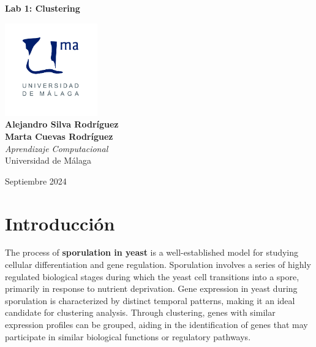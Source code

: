 \documentclass{article}
\begin{document}
\begin{titlepage}
	\centering
	\vspace*{3cm}
	
	{\Huge \textbf{Lab 1: Clustering}\\[0.5cm]}
	
	\vspace{2cm}
	\includegraphics[width=0.3\textwidth]{images/uma_logo.jpg}\\[1cm]
	
	{\LARGE \textbf{Alejandro Silva Rodríguez}\\[0.5cm]}
	{\LARGE \textbf{Marta Cuevas Rodríguez}\\[0.5cm]}
	{\large \textit{Aprendizaje Computacional}\\
		Universidad de Málaga\\
		}
	
	\vfill
	
	{\large Septiembre 2024}
\end{titlepage}

\tableofcontents

\newpage

\section{Introducción}
The process of \textbf{sporulation in yeast} is a well-established model for studying cellular differentiation and gene regulation. Sporulation involves a series of highly regulated biological stages during which the yeast cell transitions into a spore, primarily in response to nutrient deprivation. Gene expression in yeast during sporulation is characterized by distinct temporal patterns, making it an ideal candidate for clustering analysis. Through clustering, genes with similar expression profiles can be grouped, aiding in the identification of genes that may participate in similar biological functions or regulatory pathways.
\end{document}
